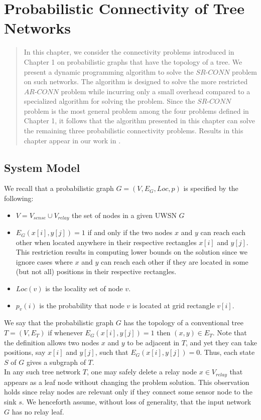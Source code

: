 \chapter{Probabilistic Connectivity of Tree Networks}
\begin{quote}

In this chapter, we consider the connectivity problems introduced in Chapter 1 on probabilistic graphs that have the topology of a tree. We present a dynamic programming algorithm to solve the $SR$-$CONN$ problem on such networks. The algorithm is designed to solve the more restricted $AR$-$CONN$ problem while incurring only a small overhead compared to a specialized algorithm for solving the problem. Since the $SR$-$CONN$ problem is the most general problem among the four problems defined in Chapter 1, it follows that the algorithm presented in this chapter can solve the remaining three probabilistic connectivity problems. Results in this chapter appear in our work in \cite{Tree2014}.
\end{quote}

\section{System Model}
\label{sec:ch3sm}
We recall that a probabilistic graph $G=(V,E_G,Loc,p)$ is specified by the following:
\begin{itemize}[noitemsep]
\item $V=V_{sense}\cup V_{relay}$ the set of nodes in a given UWSN $G$
\item $E_G(x[i],y[j])=1$ if and only if the two nodes $x$ and $y$ can reach each other when located anywhere in their respective rectangles $x[i]$ and $y[j]$. This restriction results in computing lower bounds on the solution since we ignore cases where $x$ and $y$ can reach each other if they are located in some (but not all) positions in their respective rectangles.
\item $Loc(v)$ is the locality set of node $v$. 
\item $p_v(i)$ is the probability that node $v$ is located at grid rectangle $v[i]$. 
\end{itemize}
We say that the probabilistic graph $G$ has the topology of a conventional tree $T=(V,E_T)$ if whenever $E_G(x[i],y[j])= 1$
then $(x,y) \in E_T$.
%
Note that the definition allows two nodes $x$ and $y$ to be adjacent in
$T$, and yet they can take positions, say $x[i]$ and $y[j]$, such that
$E_G (x[i],y[j])= 0$.
%
Thus, each state $S$ of $G$ gives a subgraph of $T$.\\
\nwline
In any such tree network $T$, one may safely delete a relay node
$x \in V_{relay}$ that appears as a leaf node without changing the problem
solution. 
%
This observation holds since relay nodes are relevant only if they
connect some sensor node to the sink $s$.
%
We henceforth assume, without loss of generality, that the input network $G$ has no relay leaf.\\


